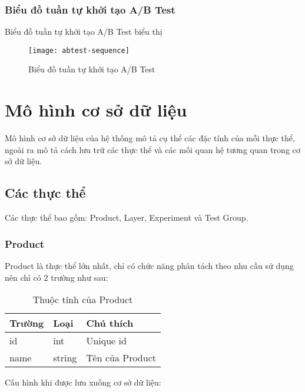 \subsubsection{Biểu đồ tuần tự khởi tạo A/B Test}

Biểu đồ tuần tự khởi tạo A/B Test biểu thị

\begin{figure}[H]
	\centering
	\texttt{[image: abtest-sequence]}
	\caption{Biểu đồ tuần tự khởi tạo A/B Test}
\end{figure}

\section{Mô hình cơ sở dữ liệu}

Mô hình cơ sở dữ liệu của hệ thống mô tả cụ thể các đặc tính của mỗi thực thể, ngoài ra mô tả
cách lưu trữ các thực thể và các mối quan hệ tương quan trong cơ sở dữ liệu.

\subsection{Các thực thể}

Các thực thể bao gồm: Product, Layer, Experiment và Test Group.

\subsubsection{Product}

Product là thực thể lớn nhất, chỉ có chức năng phân tách theo nhu cầu sử dụng nên chỉ có 2 trường như sau:
\begin{table}[H]
	\centering
	\begin{tabular}{|l|l|l|}
		\hline
		Trường & Loại   & Chú thích       \\ \hline
		id     & int    & Unique id       \\ \hline
		name   & string & Tên của Product \\ \hline
	\end{tabular}
	\caption{Thuộc tính của Product}
\end{table}

Cấu hình khi được lưu xuống cơ sở dữ liệu:

\begin{itemize}
\end{itemize}

